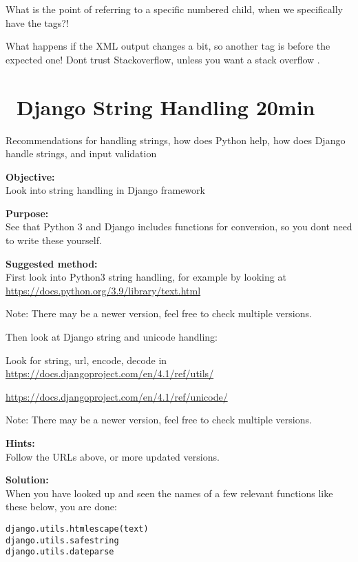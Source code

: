 \documentclass[a4paper,11pt,notitlepage]{report}
\begin{document}
What is the point of referring to a specific numbered child, when we specifically have the tags?!

What happens if the XML output changes a bit, so another tag is before the expected one! Dont trust Stackoverflow, unless you want a stack overflow \smiley.


\chapter{\faExclamationTriangle\ Django String Handling 20min}
\label{ex:django-string}

Recommendations for handling strings, how does Python help, how does Django handle strings, and input validation

{\bf Objective:}\\
Look into string handling in Django framework

{\bf Purpose:}\\
See that Python 3 and Django includes functions for conversion, so you dont need to write these yourself.

{\bf Suggested method:}\\
First look into Python3 string handling, for example by looking at\\
\url{https://docs.python.org/3.9/library/text.html}

Note: There may be a newer version, feel free to check multiple versions.

Then look at Django string and unicode handling:
\begin{list2}
\item Look for string, url, encode, decode in\\
\url{https://docs.djangoproject.com/en/4.1/ref/utils/}
\item \url{https://docs.djangoproject.com/en/4.1/ref/unicode/}
\end{list2}

Note: There may be a newer version, feel free to check multiple versions.

{\bf Hints:}\\
Follow the URLs above, or more updated versions.

{\bf Solution:}\\
When you have looked up and seen the names of a few relevant functions like these below, you are done:

\begin{alltt}
django.utils.html escape(text)
django.utils.safestring
django.utils.dateparse
\end{alltt}
\end{document}
